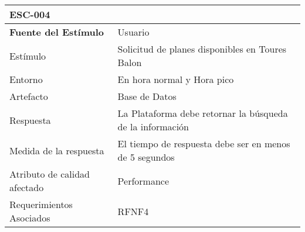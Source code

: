 \begin{table}[H]
\centering
\resizebox{17cm}{!} {
\begin{tabular}{|l|l|}
\hline
\multicolumn{2}{|l|}{\textbf{ESC-004}} \\ \hline
\textbf{Fuente del Estímulo} & Usuario \\ \hline
Estímulo & Solicitud de planes disponibles en Toures Balon \\ \hline
Entorno & En hora normal y Hora pico \\ \hline
Artefacto & Base de Datos \\ \hline
Respuesta & La Plataforma debe retornar la búsqueda de la información \\ \hline
Medida de la respuesta & El tiempo de respuesta debe ser en menos de 5 segundos \\ \hline
Atributo de calidad afectado & Performance \\ \hline
Requerimientos Asociados & RFNF4 \\ \hline
\end{tabular}
}
\end{table}